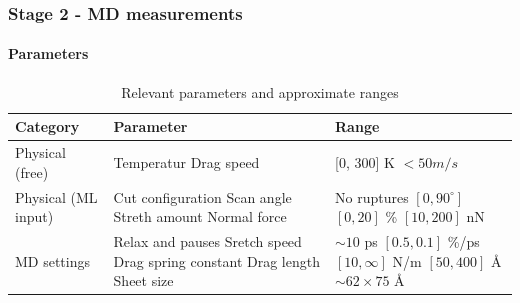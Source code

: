 \documentclass[
	10pt, %
]{beamer}
\begin{document}
\begin{frame}
	\frametitle{Stage 2 - MD measurements}
	\framesubtitle{Parameters} %
	
	\begin{table}
		\begin{tabular}{| l | p{35mm} | p{30mm} |}
			\toprule
			\textbf{Category} & \textbf{Parameter} & \textbf{Range} \\ \hline
			Physical (free) & 
			Temperatur 		 		\newline 
			Drag speed 				&
			[0, 300] K 				\newline 
			$< 50 m/s$				\\ \hline

			Physical (ML input) &
			Cut configuration 		\newline
			Scan angle 				\newline
			Streth amount 			\newline
			Normal force 			&
			No ruptures 			\newline
			$[0, 90^{\circ}]$ 		\newline
			$[0, 20]$ \% 				\newline
			$[10, 200]$ nN 			\\ \hline

			MD settings &
			Relax and pauses \newline
			Sretch speed \newline
			Drag spring constant \newline
			Drag length \newline
			Sheet size &
			$\sim 10$ ps			\newline
			$[0.5, 0.1]$ \%/ps  	\newline
			$[10, \infty]$ N/m 		\newline
			$[50, 400]$ Å 			\newline
			$\sim 62 \times 75$ Å	\\ \hline
		\end{tabular}
		\caption{Relevant parameters and approximate ranges}
	\end{table}
	
	
\end{frame}



\end{document}
